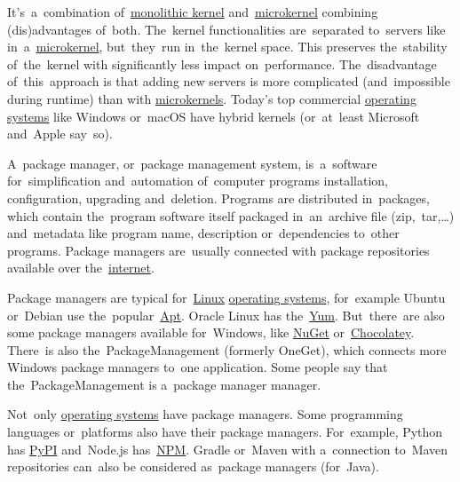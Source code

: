\label{hybridkernel}
It's~a~combination of~\hyperref[monolithickernel]{monolithic kernel} and~\hyperref[microkernel]{microkernel} combining (dis)advantages of~both. The~kernel functionalities are~separated to~servers like in~a~\hyperref[microkernel]{microkernel}, but~they~run in~the~kernel space. This preserves the~stability of~the~kernel with significantly less impact on~performance. The~disadvantage of~this~approach is that adding new servers is more complicated (and~impossible during runtime) than with \hyperref[microkernel]{microkernels}. Today's top commercial \hyperref[os]{operating systems} like Windows or~macOS have hybrid kernels (or~at~least Microsoft and~Apple say~so).

A~package manager, or~package management system, is~a~software for~simplification and~automation of~computer programs installation, configuration, upgrading and~deletion. Programs are distributed in~packages, which contain the~program software itself packaged in~an~archive file (zip,~tar,\dots) and~metadata like program name, description or~dependencies to~other programs. Package managers are~usually connected with package repositories available over the~\hyperref[internetweb]{internet}.

Package managers are typical for~\hyperref[linux]{Linux} \hyperref[os]{operating systems}, for~example Ubuntu or~Debian use the~popular~\hyperref[linuxapt]{Apt}. Oracle Linux has the~\href{http://yum.baseurl.org/}{Yum}. But~there~are also some package managers available for~Windows, like \href{https://www.nuget.org/}{NuGet} or~\href{https://chocolatey.org/}{Chocolatey}. There~is also the~PackageManagement (formerly OneGet), which connects more Windows package managers to~one application. Some people say that the~PackageManagement is a~package manager manager.

Not~only \hyperref[os]{operating systems} have package managers. Some programming languages or~platforms also have their package managers. For~example, Python has \href{https://pypi.org/}{PyPI} and~Node.js has~\href{https://www.npmjs.com/}{NPM}. Gradle or~Maven with a~connection to~Maven repositories can~also be considered as~package managers (for~Java).

